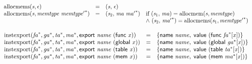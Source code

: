 $$
\begin{array}{@{}lcl@{}l@{}}
{\mathrm{allocmems}}({\mathit{s}}, \epsilon) &=& ({\mathit{s}},\, \epsilon) &  \\
{\mathrm{allocmems}}({\mathit{s}}, {\mathit{memtype}}~{{\mathit{memtype}'}^\ast}) &=& ({\mathit{s}}_{{2}},\, {\mathit{ma}}~{{\mathit{ma}'}^\ast}) &\quad
  \mbox{if}~({\mathit{s}}_{{1}},\, {\mathit{ma}}) = {\mathrm{allocmem}}({\mathit{s}}, {\mathit{memtype}}) \\
 &&&\quad {\land}~({\mathit{s}}_{{2}},\, {{\mathit{ma}'}^\ast}) = {\mathrm{allocmems}}({\mathit{s}}_{{1}}, {{\mathit{memtype}'}^\ast}) \\
\end{array}
$$

\vspace{1ex}

$$
\begin{array}{@{}lcl@{}l@{}}
{\mathrm{instexport}}({{\mathit{fa}}^\ast}, {{\mathit{ga}}^\ast}, {{\mathit{ta}}^\ast}, {{\mathit{ma}}^\ast}, \mathsf{export}~{\mathit{name}}~(\mathsf{func}~{\mathit{x}})) &=& \{ \begin{array}[t]{@{}l@{}}
\mathsf{name}~{\mathit{name}},\; \mathsf{value}~(\mathsf{func}~{{\mathit{fa}}^\ast}[{\mathit{x}}]) \}\end{array} &  \\
{\mathrm{instexport}}({{\mathit{fa}}^\ast}, {{\mathit{ga}}^\ast}, {{\mathit{ta}}^\ast}, {{\mathit{ma}}^\ast}, \mathsf{export}~{\mathit{name}}~(\mathsf{global}~{\mathit{x}})) &=& \{ \begin{array}[t]{@{}l@{}}
\mathsf{name}~{\mathit{name}},\; \mathsf{value}~(\mathsf{global}~{{\mathit{ga}}^\ast}[{\mathit{x}}]) \}\end{array} &  \\
{\mathrm{instexport}}({{\mathit{fa}}^\ast}, {{\mathit{ga}}^\ast}, {{\mathit{ta}}^\ast}, {{\mathit{ma}}^\ast}, \mathsf{export}~{\mathit{name}}~(\mathsf{table}~{\mathit{x}})) &=& \{ \begin{array}[t]{@{}l@{}}
\mathsf{name}~{\mathit{name}},\; \mathsf{value}~(\mathsf{table}~{{\mathit{ta}}^\ast}[{\mathit{x}}]) \}\end{array} &  \\
{\mathrm{instexport}}({{\mathit{fa}}^\ast}, {{\mathit{ga}}^\ast}, {{\mathit{ta}}^\ast}, {{\mathit{ma}}^\ast}, \mathsf{export}~{\mathit{name}}~(\mathsf{mem}~{\mathit{x}})) &=& \{ \begin{array}[t]{@{}l@{}}
\mathsf{name}~{\mathit{name}},\; \mathsf{value}~(\mathsf{mem}~{{\mathit{ma}}^\ast}[{\mathit{x}}]) \}\end{array} &  \\
\end{array}
$$

